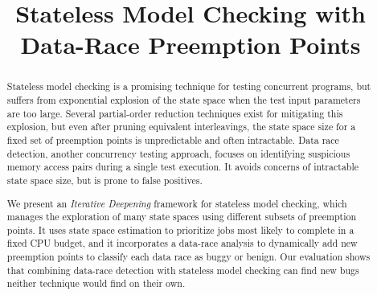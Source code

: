 \documentclass[pldi]{sigplanconf-pldi15}
\begin{document}
%
%

\newcommand\landslide{\textsc{Landslide}}
\newcommand\quicksand{\textsc{Quicksand}}
\newcommand\simics{\textsc{Simics}}
\newcommand{\sect}[1]{\S #1}
\newcommand\hilight[2]{\color{#1}#2\color{black}}

\newcommand\numthrlibs{79}
\newcommand\numpintoses{78} %
\newcommand\numstudence{157} %

\title{Stateless Model Checking with Data-Race Preemption Points}

\maketitle
\begin{abstract}
Stateless model checking is a promising technique for testing concurrent programs,
but suffers from exponential explosion of the state space when the test input parameters are too large.
Several partial-order reduction techniques exist for mitigating this explosion,
but even after pruning equivalent interleavings, the state space size for a fixed set of preemption points is unpredictable and often intractable.
%
Data race detection, another concurrency testing approach, focuses on identifying suspicious memory access pairs during a single test execution.
It avoids concerns of intractable state space size, but is prone to false positives.

We present an {\em Iterative Deepening} framework for stateless model checking,
which manages the exploration of many state spaces using different subsets of preemption points.
It uses state space estimation to prioritize jobs most likely to complete in a fixed CPU budget,
and it incorporates a data-race analysis to dynamically add new preemption points to classify each data race as buggy or benign.
%
Our evaluation shows that combining data-race detection with stateless model checking can find new bugs neither technique would find on their own.

\end{abstract}
\end{document}
